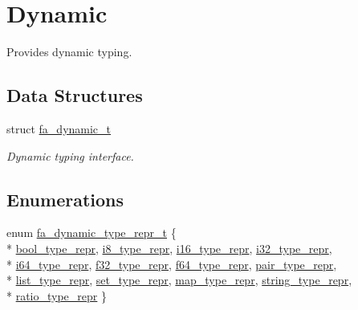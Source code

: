 \hypertarget{group___fa_dynamic}{\section{Dynamic}
\label{group___fa_dynamic}
}


Provides dynamic typing.  


\subsection*{Data Structures}
\begin{DoxyCompactItemize}
\item 
struct \hyperlink{structfa__dynamic__t}{fa\-\_\-dynamic\-\_\-t}
\begin{DoxyCompactList}\small\item\em Dynamic typing interface. \end{DoxyCompactList}\end{DoxyCompactItemize}
\subsection*{Enumerations}
\begin{DoxyCompactItemize}
\item 
enum \hyperlink{group___fa_dynamic_ga38427e999172dad2684f07793859f416}{fa\-\_\-dynamic\-\_\-type\-\_\-repr\-\_\-t} \{ \\*
\hyperlink{group___fa_dynamic_gga38427e999172dad2684f07793859f416a650f8740967e93fd6bd505be9e66da25}{bool\-\_\-type\-\_\-repr}, 
\hyperlink{group___fa_dynamic_gga38427e999172dad2684f07793859f416aa143afc69e19795fe8ad3ec810a3350f}{i8\-\_\-type\-\_\-repr}, 
\hyperlink{group___fa_dynamic_gga38427e999172dad2684f07793859f416a749a639c18497875eb6ca2c659979483}{i16\-\_\-type\-\_\-repr}, 
\hyperlink{group___fa_dynamic_gga38427e999172dad2684f07793859f416a986d45d849f556447a754059537f7619}{i32\-\_\-type\-\_\-repr}, 
\\*
\hyperlink{group___fa_dynamic_gga38427e999172dad2684f07793859f416a3cd2e66183bfd3acb4893d951c84c439}{i64\-\_\-type\-\_\-repr}, 
\hyperlink{group___fa_dynamic_gga38427e999172dad2684f07793859f416a9569f7b88a9725a95dc6d2450c2d09f3}{f32\-\_\-type\-\_\-repr}, 
\hyperlink{group___fa_dynamic_gga38427e999172dad2684f07793859f416a36db315441705cc136fb6b1c4116e824}{f64\-\_\-type\-\_\-repr}, 
\hyperlink{group___fa_dynamic_gga38427e999172dad2684f07793859f416a3a2e655a4d66c724b28570d35a16acdb}{pair\-\_\-type\-\_\-repr}, 
\\*
\hyperlink{group___fa_dynamic_gga38427e999172dad2684f07793859f416ad4ff103381c3edaa488857cfb6b49ab7}{list\-\_\-type\-\_\-repr}, 
\hyperlink{group___fa_dynamic_gga38427e999172dad2684f07793859f416abbf0c6c59d19b853ceb62ef8f252f8e4}{set\-\_\-type\-\_\-repr}, 
\hyperlink{group___fa_dynamic_gga38427e999172dad2684f07793859f416a86521286e4ad90b519c91a2c62ab67ad}{map\-\_\-type\-\_\-repr}, 
\hyperlink{group___fa_dynamic_gga38427e999172dad2684f07793859f416a2d776384cbeaba2666b0e05f3b8b7a56}{string\-\_\-type\-\_\-repr}, 
\\*
\hyperlink{group___fa_dynamic_gga38427e999172dad2684f07793859f416ad4a0998e1b4d7b4cbbe31ee7ff033101}{ratio\-\_\-type\-\_\-repr}
 \}
\end{DoxyCompactItemize}
